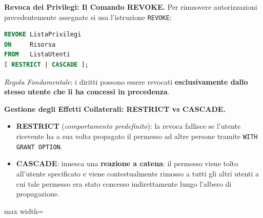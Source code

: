 \documentclass[12pt]{extarticle}
\begin{document}
\medskip
\noindent \textbf{Revoca dei Privilegi: Il Comando REVOKE.} Per rimuovere autorizzazioni precedentemente assegnate si usa l'istruzione \texttt{REVOKE}:
\begin{lstlisting}[language=SQL]
REVOKE ListaPrivilegi
ON     Risorsa
FROM   ListaUtenti
[ RESTRICT | CASCADE ];
\end{lstlisting}
\textit{Regola Fondamentale}: i diritti possono essere revocati \textbf{esclusivamente dallo stesso utente che li ha concessi in precedenza}.

\medskip
\noindent \textbf{Gestione degli Effetti Collaterali: RESTRICT vs CASCADE.}
\begin{itemize}
    \item \textbf{RESTRICT} (\textit{comportamento predefinito}): la revoca fallisce se l'utente ricevente ha a sua volta propagato il permesso ad altre persone tramite \texttt{WITH GRANT OPTION}.
    \item \textbf{CASCADE}: innesca una \textbf{reazione a catena}: il permesso viene tolto all'utente specificato e viene contestualmente rimosso a tutti gli altri utenti a cui tale permesso era stato concesso indirettamente lungo l'albero di propagazione.
\end{itemize}

\begin{center}
\begin{adjustbox}{max width=\linewidth}
\end{adjustbox}
\end{center}
\end{document}
